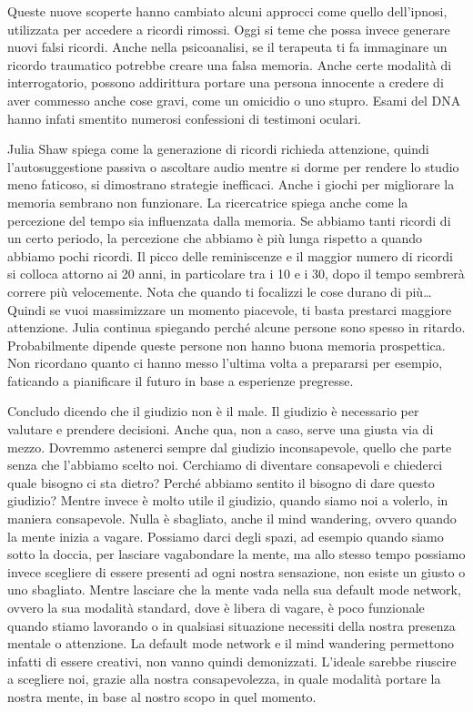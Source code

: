 \documentclass[12pt]{book} %
\begin{document}
\begin{mdframed}[linewidth=1pt]
Queste nuove scoperte hanno cambiato alcuni approcci come quello dell'ipnosi, utilizzata per accedere a ricordi rimossi.
Oggi si teme che possa invece generare nuovi falsi ricordi. 
Anche nella psicoanalisi, se il terapeuta ti fa immaginare un ricordo traumatico potrebbe creare una
falsa memoria. Anche certe modalità di interrogatorio, possono addirittura portare una persona innocente a credere di
aver commesso anche cose gravi, come un omicidio o uno stupro. Esami del DNA hanno infati smentito numerosi confessioni di testimoni oculari.

Julia Shaw spiega come la generazione di ricordi richieda attenzione, quindi l'autosuggestione
passiva o ascoltare audio mentre si dorme per rendere lo studio meno faticoso, si dimostrano strategie inefficaci.
Anche i giochi per migliorare la memoria sembrano non funzionare. La ricercatrice spiega anche come la percezione del
tempo sia influenzata dalla memoria. Se abbiamo tanti ricordi di un certo periodo, la percezione che abbiamo è più
lunga rispetto a quando abbiamo pochi ricordi. Il picco delle reminiscenze e il maggior numero di ricordi si colloca
attorno ai 20 anni, in particolare tra i 10 e i 30, dopo il tempo sembrerà correre più velocemente. 
Nota che quando ti focalizzi le cose durano di più… Quindi se vuoi massimizzare un momento piacevole, ti basta prestarci maggiore attenzione.
Julia continua spiegando perché alcune persone sono spesso in ritardo. Probabilmente dipende queste persone non hanno buona memoria prospettica.
Non ricordano quanto ci hanno messo l'ultima volta a prepararsi per esempio, faticando a pianificare il futuro in base a esperienze pregresse.
\end{mdframed}

Concludo dicendo che il giudizio non è il male. Il giudizio è necessario per valutare e prendere decisioni. Anche qua,
non a caso, serve una giusta via di mezzo. Dovremmo astenerci sempre dal giudizio inconsapevole, quello che parte senza
che l'abbiamo scelto noi. Cerchiamo di diventare consapevoli e chiederci quale bisogno ci sta dietro?
Perché abbiamo sentito il bisogno di dare questo giudizio? Mentre invece è molto utile il giudizio, quando siamo noi a
volerlo, in maniera consapevole.
Nulla è sbagliato, anche il mind wandering, ovvero quando la mente inizia a vagare. Possiamo darci degli spazi, ad
esempio quando siamo sotto la doccia, per lasciare vagabondare la mente, ma allo stesso tempo possiamo invece scegliere
di essere presenti ad ogni nostra sensazione, non esiste un giusto o uno sbagliato. Mentre lasciare che la mente vada
nella sua default mode network, ovvero la sua modalità standard, dove è libera di vagare, è poco funzionale quando
stiamo lavorando o in qualsiasi situazione necessiti della nostra presenza mentale o attenzione. 
La default mode network e il mind wandering permettono infatti di essere creativi, non vanno quindi
demonizzati.
L'ideale sarebbe riuscire a scegliere noi, grazie alla nostra consapevolezza, in quale modalità
portare la nostra mente, in base al nostro scopo in quel momento.
\end{document}
